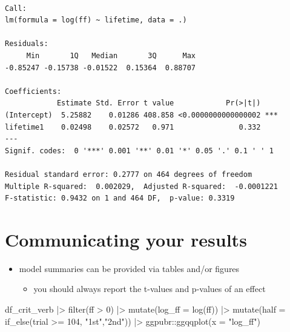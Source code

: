 \documentclass[
  letterpaper,
  DIV=11,
  numbers=noendperiod]{scrartcl}
\newenvironment{Shaded}{\begin{snugshade}}{\end{snugshade}}
\newcommand{\AttributeTok}[1]{\textcolor[rgb]{0.40,0.45,0.13}{#1}}
\newcommand{\DecValTok}[1]{\textcolor[rgb]{0.68,0.00,0.00}{#1}}
\newcommand{\FunctionTok}[1]{\textcolor[rgb]{0.28,0.35,0.67}{#1}}
\newcommand{\NormalTok}[1]{\textcolor[rgb]{0.00,0.23,0.31}{#1}}
\newcommand{\SpecialCharTok}[1]{\textcolor[rgb]{0.37,0.37,0.37}{#1}}
\newcommand{\StringTok}[1]{\textcolor[rgb]{0.13,0.47,0.30}{#1}}
\providecommand{\tightlist}{%
  \setlength{\itemsep}{0pt}\setlength{\parskip}{0pt}}\usepackage{longtable,booktabs,array}
\begin{document}
\begin{verbatim}

Call:
lm(formula = log(ff) ~ lifetime, data = .)

Residuals:
     Min       1Q   Median       3Q      Max 
-0.85247 -0.15738 -0.01522  0.15364  0.88707 

Coefficients:
            Estimate Std. Error t value            Pr(>|t|)    
(Intercept)  5.25882    0.01286 408.858 <0.0000000000000002 ***
lifetime1    0.02498    0.02572   0.971               0.332    
---
Signif. codes:  0 '***' 0.001 '**' 0.01 '*' 0.05 '.' 0.1 ' ' 1

Residual standard error: 0.2777 on 464 degrees of freedom
Multiple R-squared:  0.002029,  Adjusted R-squared:  -0.0001221 
F-statistic: 0.9432 on 1 and 464 DF,  p-value: 0.3319
\end{verbatim}

\hypertarget{communicating-your-results}{%
\section{Communicating your results}\label{communicating-your-results}}

\begin{itemize}
\tightlist
\item
  model summaries can be provided via tables and/or figures

  \begin{itemize}
  \tightlist
  \item
    you should always report the t-values and p-values of an effect
  \end{itemize}
\end{itemize}

\begin{Shaded}
\begin{Highlighting}[]
\NormalTok{df\_crit\_verb }\SpecialCharTok{|\textgreater{}} 
  \FunctionTok{filter}\NormalTok{(ff }\SpecialCharTok{\textgreater{}} \DecValTok{0}\NormalTok{) }\SpecialCharTok{|\textgreater{}} 
  \FunctionTok{mutate}\NormalTok{(}\AttributeTok{log\_ff =} \FunctionTok{log}\NormalTok{(ff)) }\SpecialCharTok{|\textgreater{}} 
  \FunctionTok{mutate}\NormalTok{(}\AttributeTok{half =} \FunctionTok{if\_else}\NormalTok{(trial }\SpecialCharTok{\textgreater{}=} \DecValTok{104}\NormalTok{, }\StringTok{"1st"}\NormalTok{,}\StringTok{"2nd"}\NormalTok{)) }\SpecialCharTok{|\textgreater{}} 
\NormalTok{  ggpubr}\SpecialCharTok{::}\FunctionTok{ggqqplot}\NormalTok{(}\AttributeTok{x =} \StringTok{"log\_ff"}\NormalTok{)}
\end{Highlighting}
\end{Shaded}
\end{document}
